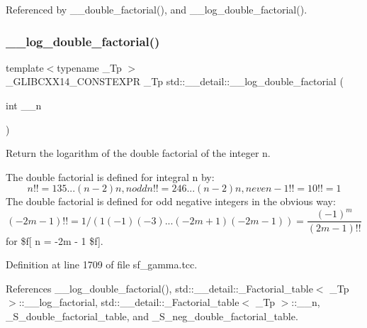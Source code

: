 Referenced by \+\_\+\+\_\+double\+\_\+factorial(), and \+\_\+\+\_\+log\+\_\+double\+\_\+factorial().

\mbox{\label{namespacestd_1_1____detail_aa832ed1d29fd41c40cf892cc1feef7e9}} 
\subsubsection{\texorpdfstring{\+\_\+\+\_\+log\+\_\+double\+\_\+factorial()}{\_\_log\_double\_factorial()}\hspace{0.1cm}{\footnotesize\ttfamily [2/2]}}
{\footnotesize\ttfamily template$<$typename \+\_\+\+Tp $>$ \\
\+\_\+\+G\+L\+I\+B\+C\+X\+X14\+\_\+\+C\+O\+N\+S\+T\+E\+X\+PR \+\_\+\+Tp std\+::\+\_\+\+\_\+detail\+::\+\_\+\+\_\+log\+\_\+double\+\_\+factorial (\begin{DoxyParamCaption}\item[{int}]{\+\_\+\+\_\+n }\end{DoxyParamCaption})}



Return the logarithm of the double factorial of the integer n. 

The double factorial is defined for integral n by\+: \[ n!! = 1 3 5 ... (n-2) n, n odd n!! = 2 4 6 ... (n-2) n, n even -1!! = 1 0!! = 1 \] The double factorial is defined for odd negative integers in the obvious way\+: \[ (-2m - 1)!! = 1 / (1 (-1) (-3) ... (-2m + 1) (-2m - 1)) = \frac{(-1)^m}{(2m-1)!!} \] for \$f\mbox{[} n = -\/2m -\/ 1 \$f\mbox{]}. 

Definition at line 1709 of file sf\+\_\+gamma.\+tcc.



References \+\_\+\+\_\+log\+\_\+double\+\_\+factorial(), std\+::\+\_\+\+\_\+detail\+::\+\_\+\+Factorial\+\_\+table$<$ \+\_\+\+Tp $>$\+::\+\_\+\+\_\+log\+\_\+factorial, std\+::\+\_\+\+\_\+detail\+::\+\_\+\+Factorial\+\_\+table$<$ \+\_\+\+Tp $>$\+::\+\_\+\+\_\+n, \+\_\+\+S\+\_\+double\+\_\+factorial\+\_\+table, and \+\_\+\+S\+\_\+neg\+\_\+double\+\_\+factorial\+\_\+table.

\mbox{\label{namespacestd_1_1____detail_a2809419dbbe9fc60066dacfdc13761d4}} 
